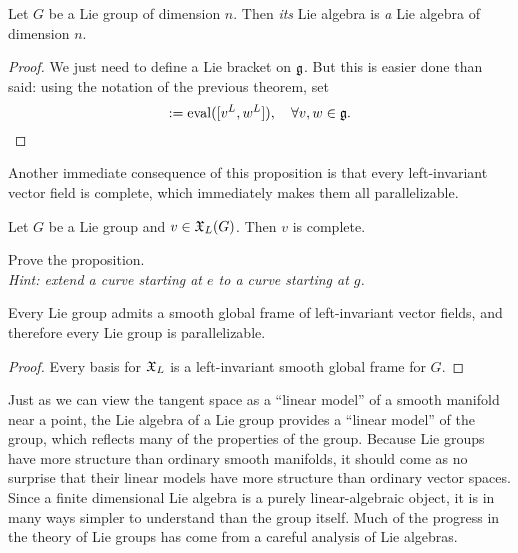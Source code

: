 \begin{corollary}
  Let $G$ be a Lie group of dimension $n$.
  Then \emph{its} Lie algebra is \emph{a} Lie algebra of dimension $n$.
\end{corollary}
\begin{proof}
  We just need to define a Lie bracket on $\mathfrak{g}$.
  But this is easier done than said: using the notation of the previous theorem, set
  \begin{equation}
    [v,w] := \mathrm{eval}([v^L, w^L]), \quad \forall v,w\in\fg.
  \end{equation}
\end{proof}

Another immediate consequence of this proposition is that every left-invariant vector field is complete, which immediately makes them all parallelizable.

\begin{proposition}\label{prop:XLcomplete}
  Let $G$ be a Lie group and $v\in\mathfrak{X}_L(G)$.
  Then $v$ is complete.
\end{proposition}
\begin{exercise}
  Prove the proposition.\\  
  \textit{\small Hint: extend a curve starting at $e$ to a curve starting at $g$.}
\end{exercise}

\begin{corollary}
  Every Lie group admits a smooth global frame of  left-invariant vector fields, and therefore every Lie group is parallelizable.
\end{corollary}
\begin{proof}
  Every basis for $\mathfrak{X}_L$ is a left-invariant smooth global frame for $G$.
\end{proof}

Just as we can view the tangent space as a ``linear model'' of a smooth manifold near a point, the Lie algebra of a Lie group provides a ``linear model'' of the group, which reflects many of the properties of the group.
Because Lie groups have more structure than ordinary smooth manifolds, it should come as no surprise that their linear models have more structure than ordinary vector spaces.
Since a finite dimensional Lie algebra is a purely linear-algebraic object, it is in many ways simpler to understand than the group itself.
Much of the progress in the theory of Lie groups has come from a careful analysis of Lie algebras.

